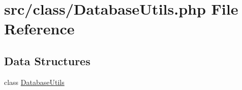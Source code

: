 \hypertarget{_database_utils_8php}{}\section{src/class/\+Database\+Utils.php File Reference}
\label{_database_utils_8php}
\subsection*{Data Structures}
\begin{DoxyCompactItemize}
\item 
class \hyperlink{class_database_utils}{Database\+Utils}
\end{DoxyCompactItemize}
